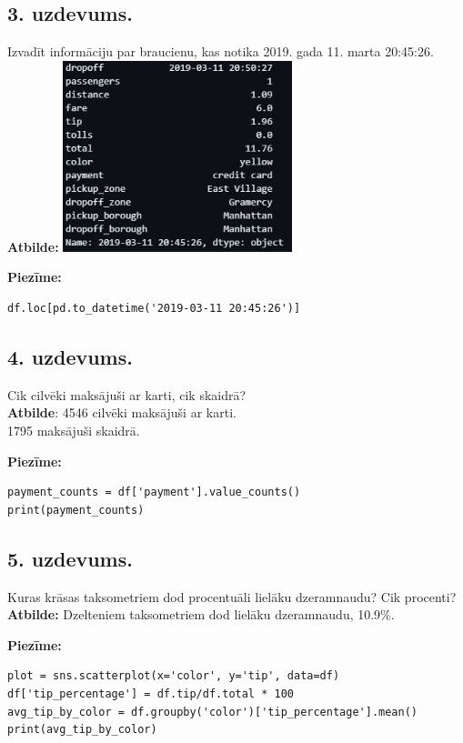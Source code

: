 \documentclass[12pt]{article}
\begin{document}
\subsection*{3. uzdevums.} Izvadīt informāciju par braucienu, kas notika 2019. gada 11. marta 20:45:26. \\
\newline \textbf{Atbilde:} \includegraphics[width=0.5\textwidth]{3.udz.png}

\noindent \textbf{Piezīme:}
\begin{verbatim}
df.loc[pd.to_datetime('2019-03-11 20:45:26')]
\end{verbatim}

\subsection*{4. uzdevums.} Cik cilvēki maksājuši ar karti, cik skaidrā?\\
\newline \textbf{Atbilde}: 4546 cilvēki maksājuši ar karti.\\
1795 maksājuši skaidrā.

\noindent \textbf{Piezīme:}
\begin{verbatim}
payment_counts = df['payment'].value_counts()
print(payment_counts)
\end{verbatim}
\subsection*{5. uzdevums.} Kuras krāsas taksometriem dod procentuāli lielāku dzeramnaudu? Cik procenti?\\
\noindent \textbf{Atbilde:} Dzelteniem taksometriem dod lielāku dzeramnaudu, 10.9\%.

\noindent \textbf{Piezīme:}
\begin{verbatim}
plot = sns.scatterplot(x='color', y='tip', data=df)
df['tip_percentage'] = df.tip/df.total * 100
avg_tip_by_color = df.groupby('color')['tip_percentage'].mean()
print(avg_tip_by_color)
\end{verbatim}
\end{document}

